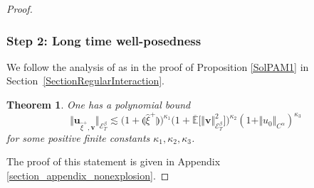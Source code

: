 \documentclass[10pt]{amsart}
\newtheorem{thm}{Theorem}
\theoremstyle{definition}
\newcommand\bbE{\mathbb{E}}
\newcommand{\mcE}{\mathcal{E}}
\newcommand{\bsu}{\boldsymbol{u}}
\newcommand{\bsv}{\boldsymbol{v}}
\newcommand{\norme}[1]{\Vert #1 \Vert}
\begin{document}
\begin{proof}
\subsubsection*{Step 2: Long time well-posedness} We follow the analysis of \cite{ShenZhuZhu} as in the proof of Proposition \ref{SolPAM1} in Section~\ref{SectionRegularInteraction}.

\begin{thm}\label{thm_nonexplosionA} One has a polynomial bound
\begin{equation} \label{EqNonExplosionMeanField}
\big\Vert {\bsu}_{\widehat\xi^+, {\bsv}}\big\Vert_{\mcE^\beta_T} \lesssim \bigl(1 + \llparenthesis \widehat\xi^+ \rrparenthesis \bigr)^{\kappa_1} \bigl(1+\overline{\bbE}\bigl[\norme{\bsv}^2_{\mcE^\beta_T}\bigr]\bigr)^{\kappa_2}(1+\norme{u_0}_{C^\alpha})^{\kappa_3}
\end{equation}
for some positive finite constants $\kappa_1,\kappa_2,\kappa_3$.
\end{thm}

The proof of this statement is given in Appendix \ref{section_appendix_nonexplosion}.


\end{proof}
\end{document}
